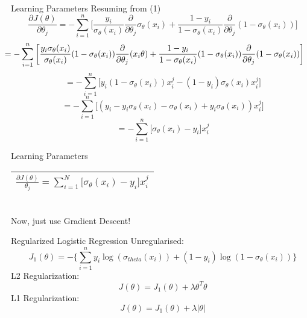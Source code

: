 \documentclass{beamer}
\begin{document}
	\begin{frame}{Learning Parameters}
	    Resuming from (1)
	    \begin{equation*}
	        \frac{\partial J(\theta)}{\partial \theta_{j}} = -\sum_{i=1}^{n}\bigg[\frac{y_{i}}{\sigma_{\theta}(x_{i})} \frac{\partial}{\partial \theta_{j}} \sigma_{\theta}(x_{i}) + \frac{1 - y_{i}}{1 - \sigma_{\theta}(x_{i})} \frac{\partial}{\partial \theta_{j}}(1 - \sigma_{\theta}(x_{i}))\bigg]
	    \end{equation*}
	    \begin{equation*}
	        \hspace{-0.7cm}= -\sum_{i=1}^{n}\bigg[\frac{y_{i}\sigma_{\theta}(x_{i})}{\sigma_{\theta}(x_{i})}(1 - \sigma_{\theta}(x_{i}))\frac{\partial}{\partial \theta_{j}} (x_{i}\theta) + \frac{1 - y_{i}}{1 - \sigma_{\theta}(x_{i})}(1 - \sigma_{\theta}(x_{i})) \frac{\partial}{\partial \theta_{j}}(1 - \sigma_{\theta}(x_{i}))\bigg]
	    \end{equation*}
	    \begin{equation*}
	        = -\sum_{i=1}^{n}\bigg[y_{i}(1 - \sigma_{\theta}(x_{i}))x_{i}^{j} - (1 - y_{i})\sigma_{\theta}(x_{i})x_{i}^{j}\bigg]
	    \end{equation*}
	    \begin{equation*}
	        = -\sum_{i=1}^{n}\bigg[(y_{i} - y_{i}\sigma_{\theta}(x_{i}) - \sigma_{\theta}(x_{i}) + y_{i}\sigma_{\theta}(x_{i}))x_{i}^{j}\bigg]
	    \end{equation*}
	    \begin{equation*}
	        = -\sum_{i=1}^{n}\bigg[\sigma_{\theta}(x_{i}) - y_{i}\bigg]x_{i}^{j}
	    \end{equation*}
	\end{frame}
	\begin{frame}{Learning Parameters}
	\centering
	  \begin{tabular}{|c|} \hline
        $\frac{\partial J(\theta)}{\theta_{j}} = \sum_{i=1}^{N}\big[\sigma_{\theta}(x_{i}) - y_{i}\big]x_{i}^{j}$\\ \hline
      \end{tabular}\\
      Now, just use Gradient Descent!
	\end{frame}
	\begin{frame}{Regularized Logistic Regression}
	    Unregularised:
	    \begin{equation*}
	        J_{1}(\theta) = -\bigg\{\sum_{i=1}^{n}y_{i}\log(\sigma_{theta}(x_{i})) + (1 - y_{i})\log(1 - \sigma_{\theta}(x_{i}))\bigg\}
	    \end{equation*}
	    L2 Regularization:
	    \begin{equation*}
	        J(\theta) = J_{1}(\theta) + \lambda\theta^{T}\theta
	    \end{equation*}
	    L1 Regularization:
	    \begin{equation*}
	        J(\theta) = J_{1}(\theta) + \lambda|\theta|
	    \end{equation*}
	\end{frame}
\end{document}
